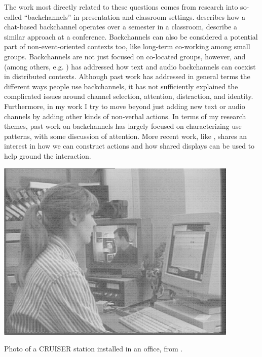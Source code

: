 The work most directly related to these questions comes from research into so-called ``backchannels'' in presentation and classroom settings. \citet{Yardi:2006uk} describes how a chat-based backchannel operates over a semester in a classroom, \citet{mccarthy_digital_2004} describe a similar approach at a conference. Backchannels can also be considered a potential part of non-event-oriented contexts too, like long-term co-working among small groups. \citep{Huang:2003ef} Backchannels are not just focused on co-located groups, however, and \citet{kellogg_leveraging_2006} (among others, e.g.  \citep{Yankelovich:2005bx}) has addressed how text and audio backchannels can coexist in distributed contexts. Although past work has addressed in general terms the different ways people use backchannels, it has not sufficiently explained the complicated issues around channel selection, attention, distraction, and identity. Furthermore, in my work I try to move beyond just adding new text or audio channels by adding other kinds of non-verbal actions. In terms of my research themes, past work on backchannels has largely focused on characterizing use patterns, with some discussion of attention. More recent work, like \citep{Bergstrom:wl}, shares an interest in how we can construct actions and how shared displays can be used to help ground the interaction.

\begin{marginfigure}
	\includegraphics{figures/CRUISER.png}
	\caption{Photo of a CRUISER station installed in an office, from \citep{Fish:1992vz}.}
	\label{fig:cruiser}
\end{marginfigure}

